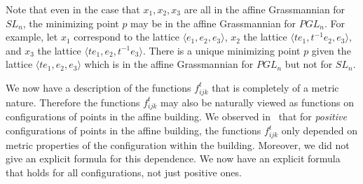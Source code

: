 \documentclass[ALCO,ThmDefs,Unicode,epreuves]{cedram}
\begin{document}
\begin{rema} Note that even in the case that $x_1, x_2, x_3$ are all in the affine Grassmannian for $SL_n$, the minimizing point $p$ may be in the affine Grassmannian for $PGL_n$. For example, let $x_1$ correspond to the lattice $\langle e_1, e_2, e_3\rangle $, $x_2$ the lattice $\langle te_1, t^{-1}e_2, e_3\rangle $, and $x_3$ the lattice $\langle te_1, e_2, t^{-1}e_3\rangle $. There is a unique minimizing point $p$ given the lattice $\langle te_1, e_2, e_3\rangle $ which is in the affine Grassmannian for $PGL_n$ but not for $SL_n$.
\end{rema}

\begin{rema} We now have a description of the functions $f_{ijk}^t$ that is completely of a metric nature. Therefore the functions $f_{ijk}^t$ may also be naturally viewed as functions on configurations of points in the affine building. We observed in~\cite{Le} that for \emph{positive} configurations of points in the affine building, the functions $f_{ijk}^t$ only depended on metric properties of the configuration within the building. Moreover, we did not give an explicit formula for this dependence. We now have an explicit formula that holds for all configurations, not just positive ones.
\end{rema}
\end{document}
